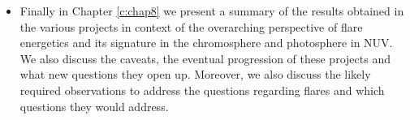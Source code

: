\begin{itemize}
    \item Finally in Chapter \ref{c:chap8} we present a summary of the results obtained in the various projects in context of the overarching perspective of flare energetics and its signature in the chromosphere and photosphere in NUV. We also discuss the caveats, the eventual progression of these projects and what new questions they open up. Moreover, we also discuss the likely required observations to address the questions regarding flares and which questions they would address.
\end{itemize}


